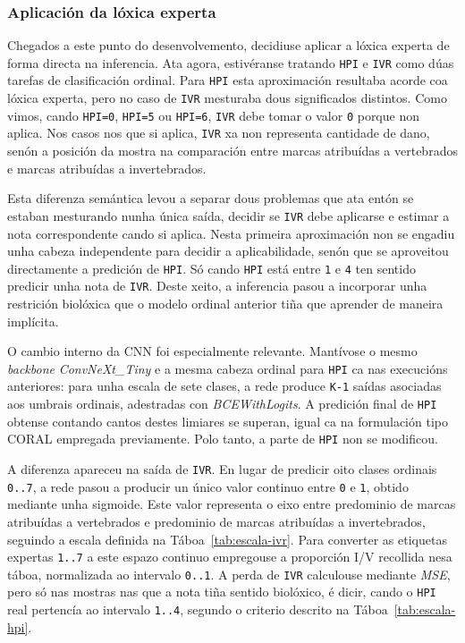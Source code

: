 \subsubsection{Aplicación da lóxica experta}
Chegados a este punto do desenvolvemento, decidiuse aplicar a lóxica experta de forma directa na
inferencia. Ata agora, estivéranse tratando \texttt{HPI} e \texttt{IVR} como dúas tarefas de
clasificación ordinal. Para \texttt{HPI} esta aproximación resultaba acorde coa lóxica experta, pero
no caso de \texttt{IVR} mesturaba dous significados distintos. Como vimos, cando
\texttt{HPI=0}, \texttt{HPI=5} ou \texttt{HPI=6}, \texttt{IVR} debe tomar o valor \texttt{0} porque
non aplica. Nos casos nos que si aplica, \texttt{IVR} xa non representa cantidade de dano, senón a
posición da mostra na comparación entre marcas atribuídas a vertebrados e marcas atribuídas a
invertebrados.

Esta diferenza semántica levou a separar dous problemas que ata entón se estaban mesturando nunha
única saída, decidir se \texttt{IVR} debe aplicarse e estimar a nota correspondente cando si aplica.
Nesta primeira aproximación non se engadiu unha cabeza independente para decidir a aplicabilidade,
senón que se aproveitou directamente a predición de \texttt{HPI}. Só cando \texttt{HPI} está entre
\texttt{1} e \texttt{4} ten sentido predicir unha nota
de \texttt{IVR}. Deste xeito, a inferencia pasou a incorporar unha restrición biolóxica que o modelo
ordinal anterior tiña que aprender de maneira implícita.

O cambio interno da CNN foi especialmente relevante. Mantívose o mesmo \textit{backbone}
\textit{ConvNeXt\_Tiny} e a mesma cabeza ordinal para \texttt{HPI} ca nas execucións anteriores:
para unha escala de sete clases, a rede produce \texttt{K-1} saídas asociadas aos umbrais ordinais,
adestradas con \textit{BCEWithLogits}. A predición final de \texttt{HPI} obtense contando cantos
destes limiares se superan, igual ca na formulación tipo CORAL empregada previamente. Polo tanto, a
parte de \texttt{HPI} non se modificou.

A diferenza apareceu na saída de \texttt{IVR}. En lugar de predicir oito clases ordinais
\texttt{0..7}, a rede pasou a producir un único valor continuo entre \texttt{0} e \texttt{1},
obtido mediante unha sigmoide. Este valor representa o eixo entre predominio de marcas atribuídas a
vertebrados e predominio de marcas atribuídas a invertebrados, seguindo a escala definida na
Táboa~\ref{tab:escala-ivr}. Para converter as etiquetas expertas \texttt{1..7} a este espazo continuo
empregouse a proporción I/V recollida nesa táboa, normalizada ao intervalo \texttt{0..1}. A perda de
\texttt{IVR} calculouse mediante \textit{MSE}, pero só nas mostras nas que a nota tiña sentido
biolóxico, é dicir, cando o \texttt{HPI} real pertencía ao intervalo \texttt{1..4}, segundo o criterio
descrito na Táboa~\ref{tab:escala-hpi}.

